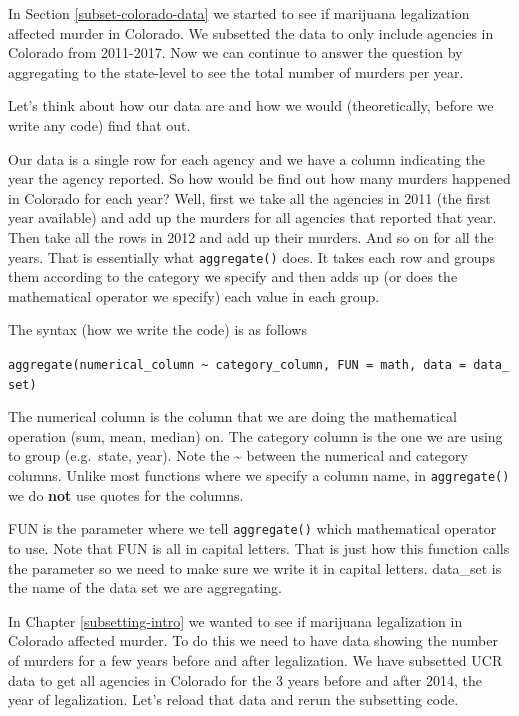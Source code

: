 \documentclass[
  12pt,
]{book}
\begin{document}
In Section \ref{subset-colorado-data} we started to see if marijuana legalization affected murder in Colorado. We subsetted the data to only include agencies in Colorado from 2011-2017. Now we can continue to answer the question by aggregating to the state-level to see the total number of murders per year.

Let's think about how our data are and how we would (theoretically, before we write any code) find that out.

Our data is a single row for each agency and we have a column indicating the year the agency reported. So how would be find out how many murders happened in Colorado for each year? Well, first we take all the agencies in 2011 (the first year available) and add up the murders for all agencies that reported that year. Then take all the rows in 2012 and add up their murders. And so on for all the years. That is essentially what \texttt{aggregate()} does. It takes each row and groups them according to the category we specify and then adds up (or does the mathematical operator we specify) each value in each group.

The syntax (how we write the code) is as follows

\texttt{aggregate(numerical\_column\ \textasciitilde{}\ category\_column,\ FUN\ =\ math,\ data\ =\ data\_set)}

The numerical column is the column that we are doing the mathematical operation (sum, mean, median) on. The category column is the one we are using to group (e.g.~state, year). Note the \textasciitilde{} between the numerical and category columns. Unlike most functions where we specify a column name, in \texttt{aggregate()} we do \textbf{not} use quotes for the columns.

FUN is the parameter where we tell \texttt{aggregate()} which mathematical operator to use. Note that FUN is all in capital letters. That is just how this function calls the parameter so we need to make sure we write it in capital letters. data\_set is the name of the data set we are aggregating.

In Chapter \ref{subsetting-intro} we wanted to see if marijuana legalization in Colorado affected murder. To do this we need to have data showing the number of murders for a few years before and after legalization. We have subsetted UCR data to get all agencies in Colorado for the 3 years before and after 2014, the year of legalization. Let's reload that data and rerun the subsetting code.
\end{document}
